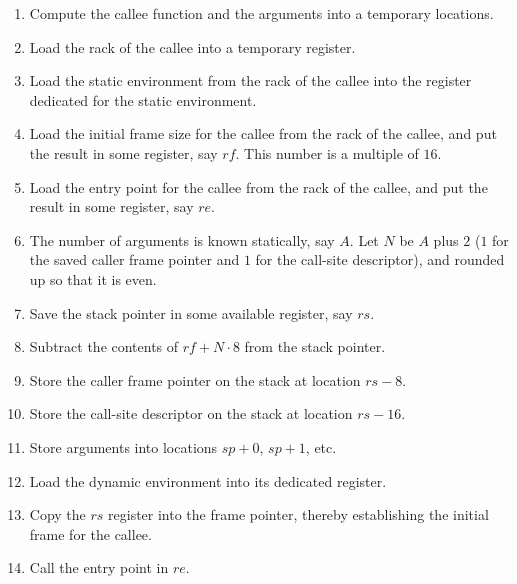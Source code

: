 \begin{enumerate}
\item Compute the callee function and the arguments into a temporary
  locations.
\item Load the rack of the callee into a temporary register.
\item Load the static environment from the rack of the callee into the
  register dedicated for the static environment.
\item Load the initial frame size for the callee from the rack of the
  callee, and put the result in some register, say $rf$.  This number
  is a multiple of $16$.
\item Load the entry point for the callee from the rack of the callee,
  and put the result in some register, say $re$.
\item The number of arguments is known statically, say $A$.  Let $N$
  be $A$ plus $2$ ($1$ for the saved caller frame pointer and $1$ for
  the call-site descriptor), and rounded up so that it is even.
\item Save the stack pointer in some available register, say $rs$.
\item Subtract the contents of $rf + N \cdot 8$ from the stack
  pointer.
\item Store the caller frame pointer on the stack at location $rs - 8$.
\item Store the call-site descriptor on the stack at location $rs -
  16$.
\item Store arguments into locations $sp +  0$, $sp +  1$, etc.
\item Load the dynamic environment into its dedicated register.
\item Copy the $rs$ register into the frame pointer, thereby
  establishing the initial frame for the callee.
\item Call the entry point in $re$.
\end{enumerate}

